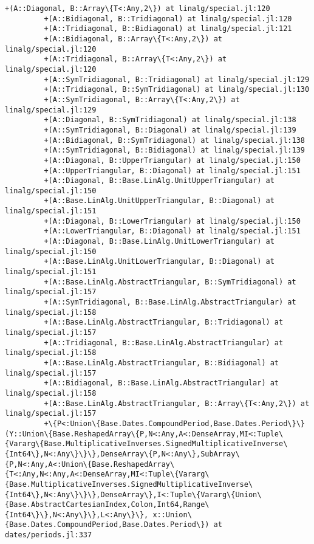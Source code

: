 \documentclass[11pt]{article}
\begin{document}
\begin{Verbatim}[commandchars=\\\{\}]
         +(A::Diagonal, B::Array\{T<:Any,2\}) at linalg/special.jl:120
         +(A::Bidiagonal, B::Tridiagonal) at linalg/special.jl:120
         +(A::Tridiagonal, B::Bidiagonal) at linalg/special.jl:121
         +(A::Bidiagonal, B::Array\{T<:Any,2\}) at linalg/special.jl:120
         +(A::Tridiagonal, B::Array\{T<:Any,2\}) at linalg/special.jl:120
         +(A::SymTridiagonal, B::Tridiagonal) at linalg/special.jl:129
         +(A::Tridiagonal, B::SymTridiagonal) at linalg/special.jl:130
         +(A::SymTridiagonal, B::Array\{T<:Any,2\}) at linalg/special.jl:129
         +(A::Diagonal, B::SymTridiagonal) at linalg/special.jl:138
         +(A::SymTridiagonal, B::Diagonal) at linalg/special.jl:139
         +(A::Bidiagonal, B::SymTridiagonal) at linalg/special.jl:138
         +(A::SymTridiagonal, B::Bidiagonal) at linalg/special.jl:139
         +(A::Diagonal, B::UpperTriangular) at linalg/special.jl:150
         +(A::UpperTriangular, B::Diagonal) at linalg/special.jl:151
         +(A::Diagonal, B::Base.LinAlg.UnitUpperTriangular) at linalg/special.jl:150
         +(A::Base.LinAlg.UnitUpperTriangular, B::Diagonal) at linalg/special.jl:151
         +(A::Diagonal, B::LowerTriangular) at linalg/special.jl:150
         +(A::LowerTriangular, B::Diagonal) at linalg/special.jl:151
         +(A::Diagonal, B::Base.LinAlg.UnitLowerTriangular) at linalg/special.jl:150
         +(A::Base.LinAlg.UnitLowerTriangular, B::Diagonal) at linalg/special.jl:151
         +(A::Base.LinAlg.AbstractTriangular, B::SymTridiagonal) at linalg/special.jl:157
         +(A::SymTridiagonal, B::Base.LinAlg.AbstractTriangular) at linalg/special.jl:158
         +(A::Base.LinAlg.AbstractTriangular, B::Tridiagonal) at linalg/special.jl:157
         +(A::Tridiagonal, B::Base.LinAlg.AbstractTriangular) at linalg/special.jl:158
         +(A::Base.LinAlg.AbstractTriangular, B::Bidiagonal) at linalg/special.jl:157
         +(A::Bidiagonal, B::Base.LinAlg.AbstractTriangular) at linalg/special.jl:158
         +(A::Base.LinAlg.AbstractTriangular, B::Array\{T<:Any,2\}) at linalg/special.jl:157
         +\{P<:Union\{Base.Dates.CompoundPeriod,Base.Dates.Period\}\}(Y::Union\{Base.ReshapedArray\{P,N<:Any,A<:DenseArray,MI<:Tuple\{Vararg\{Base.MultiplicativeInverses.SignedMultiplicativeInverse\{Int64\},N<:Any\}\}\},DenseArray\{P,N<:Any\},SubArray\{P,N<:Any,A<:Union\{Base.ReshapedArray\{T<:Any,N<:Any,A<:DenseArray,MI<:Tuple\{Vararg\{Base.MultiplicativeInverses.SignedMultiplicativeInverse\{Int64\},N<:Any\}\}\},DenseArray\},I<:Tuple\{Vararg\{Union\{Base.AbstractCartesianIndex,Colon,Int64,Range\{Int64\}\},N<:Any\}\},L<:Any\}\}, x::Union\{Base.Dates.CompoundPeriod,Base.Dates.Period\}) at dates/periods.jl:337

\end{Verbatim}
\end{document}
